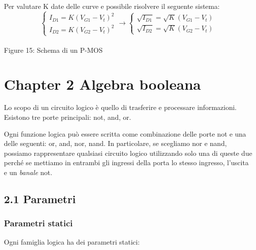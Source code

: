 \documentclass[
]{article}
\begin{document}
Per valutare K date delle curve e possibile risolvere il seguente
sistema: \[
\begin{cases}
I_{D1}=K(V_{G1}-V_{t})^{2}\\
I_{D2}=K(V_{G2}-V_{t})^{2}\end{cases}\longrightarrow\begin{cases}\sqrt{I_{D1}}=\sqrt{K}(V_{G1}-V_{t})\\
\sqrt{I_{D2}}=\sqrt{K}(V_{G2}-V_{t})
\end{cases}
\]\\
Figure 15: Schema di un P-MOS

\newpage

\section{Chapter 2 Algebra booleana}\label{chapter-2-algebra-booleana}

Lo scopo di un circuito logico è quello di trasferire e processare
informazioni. Esistono tre porte principali: not, and, or.

Ogni funzione logica può essere scritta come combinazione delle porte
not e una delle seguenti: or, and, nor, nand. In particolare, se
scegliamo nor e nand, possiamo rappresentare qualsiasi circuito logico
utilizzando solo una di queste due perché se mettiamo in entrambi gli
ingressi della porta lo stesso ingresso, l'uscita e un \emph{banale}
not.

\subsection{2.1 Parametri}\label{parametri}

\subsubsection{Parametri statici}\label{parametri-statici}

Ogni famiglia logica ha dei parametri statici:
\end{document}
